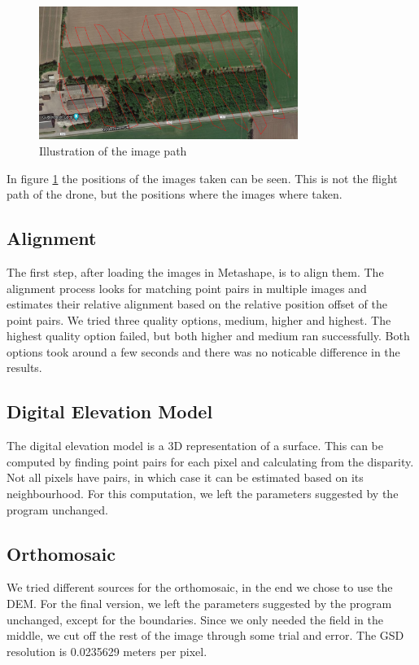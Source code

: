 \documentclass[../Head/Main.tex]{subfiles}
\begin{document}
\begin{figure}[H]
	\centering
	\includegraphics[width=0.75\textwidth]{../Figures/Flight_path}
	\caption{Illustration of the image path}
	\label{fig:flight_path}
	\vspace{-15pt}
\end{figure}
In figure \ref{fig:flight_path} the positions of the images taken can be seen. This is not the flight path of the drone, but the positions where the images where taken.

\subsection{Alignment}

The first step, after loading the images in Metashape, is to align them.
The alignment process looks for matching point pairs in multiple images and estimates their relative alignment based on the relative position offset of the point pairs.
We tried three quality options, medium, higher and highest.
The highest quality option failed, but both higher and medium ran successfully.
Both options took around a few seconds and there was no noticable difference in the results.

\subsection{Digital Elevation Model}
The digital elevation model is a 3D representation of a surface.
This can be computed by finding point pairs for each pixel and calculating from the disparity.
Not all pixels have pairs, in which case it can be estimated based on its neighbourhood.
For this computation, we left the parameters suggested by the program unchanged.

\subsection{Orthomosaic}
We tried different sources for the orthomosaic, in the end we chose to use the DEM.
For the final version, we left the parameters suggested by the program unchanged, except for the boundaries.
Since we only needed the field in the middle, we cut off the rest of the image through some trial and error.
The GSD resolution is 0.0235629 meters per pixel.
\end{document}
